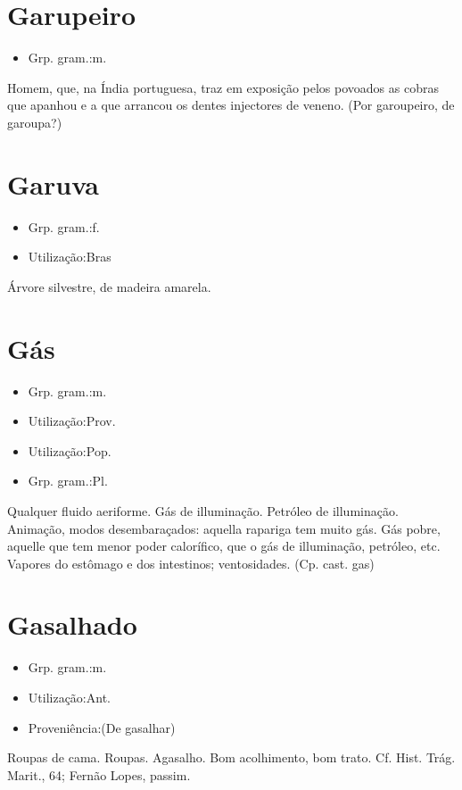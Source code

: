 \section{Garupeiro}
\begin{itemize}
\item {Grp. gram.:m.}
\end{itemize}
Homem, que, na Índia portuguesa, traz em exposição pelos povoados as cobras que apanhou e a que arrancou os dentes injectores de veneno.
(Por \textunderscore garoupeiro\textunderscore , de \textunderscore garoupa\textunderscore ?)
\section{Garuva}
\begin{itemize}
\item {Grp. gram.:f.}
\end{itemize}
\begin{itemize}
\item {Utilização:Bras}
\end{itemize}
Árvore silvestre, de madeira amarela.
\section{Gás}
\begin{itemize}
\item {Grp. gram.:m.}
\end{itemize}
\begin{itemize}
\item {Utilização:Prov.}
\end{itemize}
\begin{itemize}
\item {Utilização:Pop.}
\end{itemize}
\begin{itemize}
\item {Grp. gram.:Pl.}
\end{itemize}
Qualquer fluido aeriforme.
Gás de illuminação.
Petróleo de illuminação.
Animação, modos desembaraçados: \textunderscore aquella rapariga tem muito gás\textunderscore .
\textunderscore Gás pobre\textunderscore , aquelle que tem menor poder calorífico, que o gás de illuminação, petróleo, etc.
Vapores do estômago e dos intestinos; ventosidades.
(Cp. cast. \textunderscore gas\textunderscore )
\section{Gasalhado}
\begin{itemize}
\item {Grp. gram.:m.}
\end{itemize}
\begin{itemize}
\item {Utilização:Ant.}
\end{itemize}
\begin{itemize}
\item {Proveniência:(De \textunderscore gasalhar\textunderscore )}
\end{itemize}
Roupas de cama.
Roupas.
Agasalho.
Bom acolhimento, bom trato. Cf. \textunderscore Hist. Trág. Marit.\textunderscore , 64; Fernão Lopes, \textunderscore passim\textunderscore .
